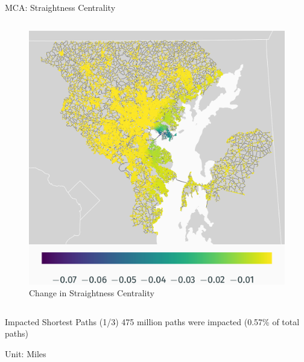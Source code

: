 \documentclass{beamer}
\numberwithin{figure}{section} %
\numberwithin{table}{section} %
\begin{document}
\begin{frame}{MCA: Straightness Centrality}
\begin{columns}
        \begin{column}{0.33\textwidth}
            \begin{figure}
                \centering
                \includegraphics[width=\textwidth]{maps/straightness_diff.png}
                {\scriptsize Change in Straightness Centrality}
            \end{figure}
        \end{column}
    \end{columns}
\end{frame}

\begin{frame}{Impacted Shortest Paths (1/3)}
    475 million paths were impacted (0.57\% of total paths)

    \begin{table}
        \centering
        {\scriptsize Unit: Miles}
        \label{tab:spaths}
      \end{table}
\end{frame}
\end{document}
